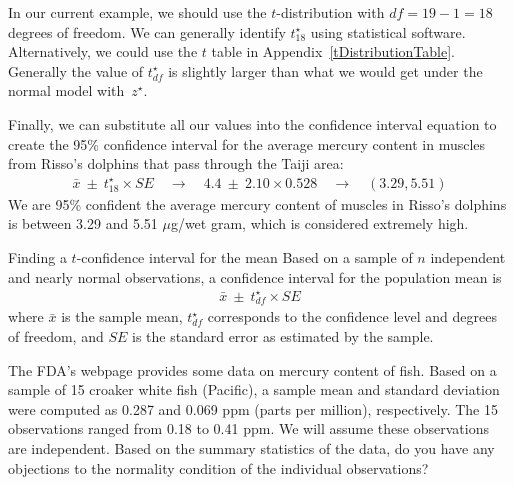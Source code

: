 In our current example, we should use the $t$-distribution
with $df=19-1=18$ degrees of freedom.
We can generally identify $t_{18}^{\star}$
using statistical software.
Alternatively, we could use the $t$ table in
Appendix~\ref{tDistributionTable}.
Generally the value of $t^{\star}_{df}$ is slightly larger
than what we would get under the normal model with~$z^{\star}$.

Finally, we can substitute all our values into the confidence interval equation to create the 95\% confidence interval for the average mercury content in muscles from Risso's dolphins that pass through the Taiji area:
\begin{align*}
\bar{x} \ \pm\  t^{\star}_{18} \times SE
  \quad \to \quad 4.4 \ \pm\  2.10 \times 0.528
  \quad \to \quad (3.29, 5.51)
\end{align*}
We are 95\% confident the average mercury content of muscles in Risso's dolphins is between 3.29 and 5.51 $\mu$g/wet gram, which is considered extremely high.


\begin{onebox}{Finding a $t$-confidence interval
    for the mean}
  Based on a sample of $n$ independent and nearly normal
  observations, a confidence interval for the population
  mean is
  \begin{align*}
  \bar{x} \ \pm\  t^{\star}_{df} \times SE
  \end{align*}
  where $\bar{x}$ is the sample mean, $t^{\star}_{df}$
  corresponds to the confidence level and degrees of freedom,
  and $SE$ is the standard error as estimated by the sample.
\end{onebox}

\begin{exercisewrap}
\begin{nexercise} \label{croakerWhiteFishPacificExerConditions}
The FDA's webpage provides some data on mercury content of fish. Based on a sample of 15 croaker white fish (Pacific), a sample mean and standard deviation were computed as 0.287 and 0.069 ppm (parts per million), respectively. The 15 observations ranged from 0.18 to 0.41 ppm. We will assume these observations are independent. Based on the summary statistics of the data, do you have any objections to the normality condition of the individual observations?\footnotemark{}
\end{nexercise}
\end{exercisewrap}


